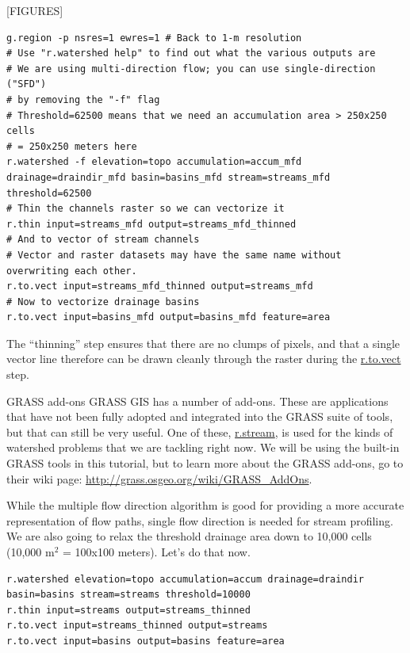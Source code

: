 \documentclass{book}
\begin{document}
[FIGURES]

\begin{lstlisting}
g.region -p nsres=1 ewres=1 # Back to 1-m resolution
# Use "r.watershed help" to find out what the various outputs are
# We are using multi-direction flow; you can use single-direction ("SFD")
# by removing the "-f" flag
# Threshold=62500 means that we need an accumulation area > 250x250 cells
# = 250x250 meters here
r.watershed -f elevation=topo accumulation=accum_mfd drainage=draindir_mfd basin=basins_mfd stream=streams_mfd threshold=62500
# Thin the channels raster so we can vectorize it
r.thin input=streams_mfd output=streams_mfd_thinned
# And to vector of stream channels
# Vector and raster datasets may have the same name without overwriting each other.
r.to.vect input=streams_mfd_thinned output=streams_mfd
# Now to vectorize drainage basins
r.to.vect input=basins_mfd output=basins_mfd feature=area
\end{lstlisting}

The ``thinning'' step ensures that there are no clumps of pixels, and that a single vector line therefore can be drawn cleanly through the raster during the \url{r.to.vect} step.

\begin{boxx}[!ht]
\begin{bclogo}[arrondi = 0.1, logo = \bcrosevents]{GRASS add-ons}
GRASS GIS has a number of add-ons. These are applications that have not been fully adopted and integrated into the GRASS suite of tools, but that can still be very useful. One of these, \url{r.stream}, is used for the kinds of watershed problems that we are tackling right now. We will be using the built-in GRASS tools in this tutorial, but to learn more about the GRASS add-ons, go to their wiki page: \url{http://grass.osgeo.org/wiki/GRASS_AddOns}.
\end{bclogo}
\caption{GRASS add-ons}
\end{boxx}


While the multiple flow direction algorithm is good for providing a more accurate representation of flow paths, single flow direction is needed for stream profiling. We are also going to relax the threshold drainage area down to 10,000 cells (10,000 m$^2$ = 100x100 meters). Let's do that now.

\begin{lstlisting}
r.watershed elevation=topo accumulation=accum drainage=draindir basin=basins stream=streams threshold=10000
r.thin input=streams output=streams_thinned
r.to.vect input=streams_thinned output=streams
r.to.vect input=basins output=basins feature=area
\end{lstlisting}
\end{document}

